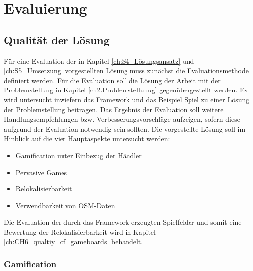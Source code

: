 \chapter{Evaluierung}
\label{ch:S6_Evaluierung}

\section{Qualität der Lösung}
\label{ch:CH6_qualtiy_of_solution}

Für eine Evaluation der in Kapitel \ref{ch:S4_Lösungsansatz} und \ref{ch:S5_Umsetzung} vorgestellten Lösung muss zunächst die Evaluationsmethode definiert werden. Für die Evaluation soll die Lösung der Arbeit mit der Problemstellung in Kapitel \ref{ch2:Problemstellunug} gegenübergestellt werden. Es wird untersucht inwiefern das Framework und das Beispiel Spiel zu einer Lösung der Problemstellung beitragen. Das Ergebnis der Evaluation soll weitere Handlungsempfehlungen bzw. Verbesserungsvorschläge aufzeigen, sofern diese aufgrund der Evaluation notwendig sein sollten. 
Die vorgestellte Lösung soll im Hinblick auf die vier Hauptaspekte untersucht werden:

\begin{itemize}

\item Gamification unter Einbezug der Händler
\item Pervasive Games
\item Relokalisierbarkeit
\item Verwendbarkeit von OSM-Daten

\end{itemize}

Die Evaluation der durch das Framework erzeugten Spielfelder und somit eine Bewertung der Relokalisierbarkeit wird in Kapitel \ref{ch:CH6_qualtiy_of_gameboards} behandelt.


\subsection*{Gamification}

